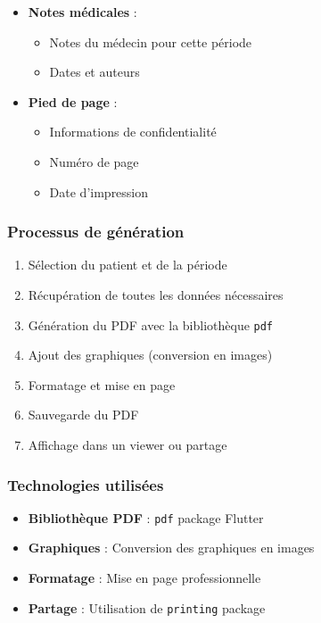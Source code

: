 \documentclass[a4paper,11pt]{report}
\begin{document}
\begin{itemize}
    \item \textbf{Notes médicales} :
    \begin{itemize}
        \item Notes du médecin pour cette période
        \item Dates et auteurs
    \end{itemize}
    
    \item \textbf{Pied de page} :
    \begin{itemize}
        \item Informations de confidentialité
        \item Numéro de page
        \item Date d'impression
    \end{itemize}
\end{itemize}

\subsubsection{Processus de génération}

\begin{enumerate}
    \item Sélection du patient et de la période
    \item Récupération de toutes les données nécessaires
    \item Génération du PDF avec la bibliothèque \texttt{pdf}
    \item Ajout des graphiques (conversion en images)
    \item Formatage et mise en page
    \item Sauvegarde du PDF
    \item Affichage dans un viewer ou partage
\end{enumerate}

\subsubsection{Technologies utilisées}

\begin{itemize}
    \item \textbf{Bibliothèque PDF} : \texttt{pdf} package Flutter
    \item \textbf{Graphiques} : Conversion des graphiques en images
    \item \textbf{Formatage} : Mise en page professionnelle
    \item \textbf{Partage} : Utilisation de \texttt{printing} package
\end{itemize}
\end{document}
